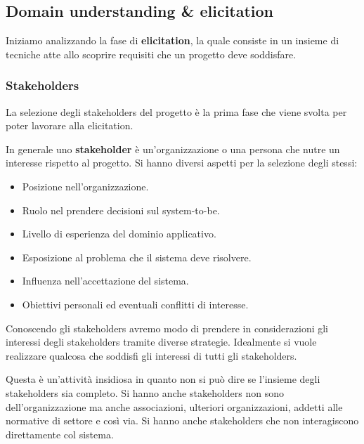 \subsection{Domain understanding \& elicitation}
Iniziamo analizzando la fase di \textbf{elicitation}, la quale consiste in un insieme di tecniche atte allo scoprire requisiti che un progetto deve soddisfare.
\subsubsection{Stakeholders}
La selezione degli stakeholders del progetto è la prima fase che viene svolta per poter lavorare alla elicitation.
\begin{definizione}
    In generale uno \textbf{stakeholder} è un'organizzazione o una persona che nutre un interesse rispetto al progetto. Si hanno diversi aspetti per la selezione degli stessi:
    \begin{itemize}
        \item Posizione nell'organizzazione.
        \item Ruolo nel prendere decisioni sul system-to-be.
        \item Livello di esperienza del dominio applicativo.
        \item Esposizione al problema che il sistema deve risolvere.
        \item Influenza nell'accettazione del sistema.
        \item Obiettivi personali ed eventuali conflitti di interesse.
    \end{itemize}
\end{definizione} 
Conoscendo gli stakeholders avremo modo di prendere in considerazioni gli interessi degli stakeholders tramite diverse strategie. Idealmente si vuole realizzare qualcosa che soddisfi gli interessi di tutti gli stakeholders.

Questa è un'attività insidiosa in quanto non si può dire se l'insieme degli stakeholders sia completo. Si hanno anche stakeholders non sono dell'organizzazione ma anche associazioni, ulteriori organizzazioni, addetti alle normative di settore e così via. Si hanno anche stakeholders che non interagiscono direttamente col sistema.

